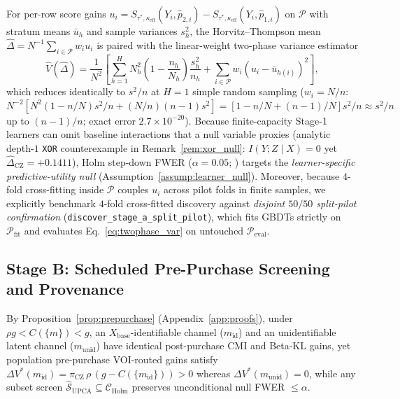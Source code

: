 \documentclass[11pt]{article}
\theoremstyle{remark}
\begin{document}
For per-row score gains $u_i = S_{\tau^*,\kappa_{\text{eff}}}(Y_i, \hat{p}_{2,i}) - S_{\tau^*,\kappa_{\text{eff}}}(Y_i, \hat{p}_{1,i})$ on $\mathcal{P}$ with stratum means $\bar{u}_h$ and sample variances $s_h^2$, the Horvitz--Thompson mean $\hat{\Delta} = N^{-1}\sum_{i \in \mathcal{P}} w_i u_i$ is paired with the linear-weight two-phase variance estimator \citep{breslow2009using,satz2026pilot,satz2026collision}
\begin{equation}
  \widehat{V}(\hat{\Delta}) = \frac{1}{N^2}\left[\sum_{h=1}^{H} N_h^2 \left(1 - \frac{n_h}{N_h}\right)\frac{s_h^2}{n_h} + \sum_{i \in \mathcal{P}} w_i (u_i - \bar{u}_{h(i)})^2\right],
  \label{eq:twophase_var}
\end{equation}
which reduces identically to $s^2/n$ at $H=1$ simple random sampling ($w_i = N/n$: $N^{-2}[N^2(1-n/N)s^2/n + (N/n)(n-1)s^2] = [1 - n/N + (n-1)/N]s^2/n \approx s^2/n$ up to $(n-1)/n$; exact error $2.7\times 10^{-20}$). Because finite-capacity Stage-1 learners can omit baseline interactions that a null variable proxies (analytic depth-$1$ \texttt{XOR} counterexample in Remark~\ref{rem:xor_null}: $I(Y;Z\mid X)=0$ yet $\hat{\Delta}_{\text{CZ}} = +0.1411$), Holm step-down FWER ($\alpha=0.05$; \citealp{holm1979simple,williamson2021nonparametric}) targets the \emph{learner-specific predictive-utility null} (Assumption~\ref{assump:learner_null}). Moreover, because $4$-fold cross-fitting inside $\mathcal{P}$ couples $u_i$ across pilot folds in finite samples, we explicitly benchmark $4$-fold cross-fitted discovery against \emph{disjoint $50/50$ split-pilot confirmation} (\texttt{discover\_stage\_a\_split\_pilot}), which fits GBDTs strictly on $\mathcal{P}_{\text{fit}}$ and evaluates Eq.~\eqref{eq:twophase_var} on untouched $\mathcal{P}_{\text{eval}}$.

\subsection{Stage B: Scheduled Pre-Purchase Screening and Provenance}
\label{sec:stage_b}

By Proposition~\ref{prop:prepurchase} (Appendix~\ref{app:proofs}), under $\rho g < C(\{m\}) < g$, an $X_{\text{base}}$-identifiable channel ($m_{\text{id}}$) and an unidentifiable latent channel ($m_{\text{unid}}$) have identical post-purchase CMI and Beta-KL gains, yet population pre-purchase VOI-routed gains satisfy $\Delta V^*(m_{\text{id}}) = \pi_{\text{CZ}}\,\rho\,(g - C(\{m_{\text{id}}\})) > 0$ whereas $\Delta V^*(m_{\text{unid}}) = 0$, while any subset screen $\hat{\mathcal{S}}_{\text{UPCA}} \subseteq \mathcal{C}_{\text{Holm}}$ preserves unconditional null FWER $\le \alpha$.
\end{document}
